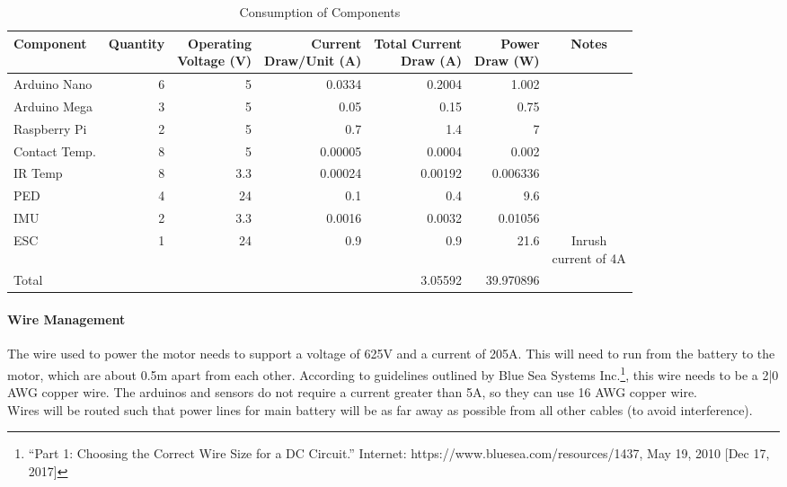 \documentclass[main.tex]{subfile}
\begin{document}
    \begin{table}[H]
        \centering
        \begin{tabular}{@{}lrrrrrc@{}} \toprule
            Component & Quantity & \makecell{Operating \\ Voltage (V)} & \makecell{Current \\ Draw/Unit (A)} & \makecell{Total Current \\ Draw (A)} & \makecell{Power \\ Draw (W)} & Notes\\ \midrule
            Arduino Nano & 6 & 5 & 0.0334 & 0.2004 & 1.002 &\\
            Arduino Mega & 3 & 5 & 0.05 & 0.15 & 0.75 &\\
            Raspberry Pi & 2 & 5 & 0.7 & 1.4 & 7 &\\
            Contact Temp. & 8 & 5 & 0.00005 & 0.0004 & 0.002 &\\
            IR Temp & 8 & 3.3 & 0.00024 & 0.00192 & 0.006336 &\\
            PED & 4 & 24 & 0.1 & 0.4 & 9.6 &\\
            IMU & 2 & 3.3 & 0.0016 & 0.0032 & 0.01056 &\\
            ESC & 1 & 24 & 0.9 & 0.9 & 21.6 & \makecell{Inrush \\ current of 4A}\\ \midrule
            Total & & & & 3.05592 & 39.970896 &\\ \bottomrule
        \end{tabular}
        \caption{Consumption of Components}
    \end{table}
    \paragraph{Wire Management}
    The wire used to power the motor needs to support a voltage of 625V and a current of 205A. This will need to run from the battery to the motor, which are about 0.5m apart from each other. According to guidelines outlined by Blue Sea Systems Inc.\footnote{“Part 1: Choosing the Correct Wire Size for a DC Circuit.” Internet: https://www.bluesea.com/resources/1437, May 19, 2010 [Dec 17, 2017]}, this wire needs to be a 2|0 AWG copper wire. The arduinos and sensors do not require a current greater than 5A, so they can use 16 AWG copper wire.\\

    Wires will be routed such that power lines for main battery will be as far away as possible from all other cables (to avoid interference).
\end{document}
